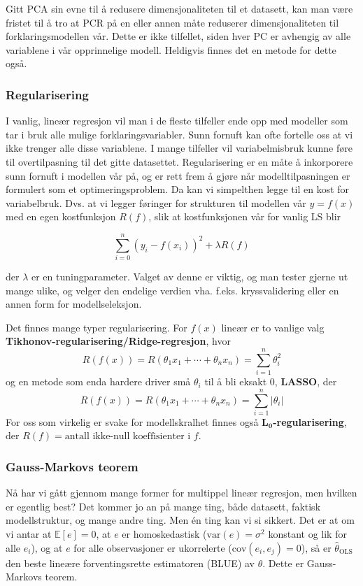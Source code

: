 Gitt PCA sin evne til å redusere dimensjonaliteten til et datasett, kan man være fristet til å tro at PCR på en eller annen måte reduserer dimensjonaliteten til forklaringsmodellen vår. Dette er ikke tilfellet, siden hver PC er avhengig av alle variablene i vår opprinnelige modell. Heldigvis finnes det en metode for dette også.

\subsubsection{Regularisering}
I vanlig, lineær regresjon vil man i de fleste tilfeller ende opp med modeller som tar i bruk alle mulige forklaringsvariabler. Sunn fornuft kan ofte fortelle oss at vi ikke trenger alle disse variablene. I mange tilfeller vil variabelmisbruk kunne føre til overtilpasning til det gitte datasettet. Regularisering er en måte å inkorporere sunn fornuft i modellen vår på, og er rett frem å gjøre når modelltilpasningen er formulert som et optimeringsproblem. Da kan vi simpelthen legge til en kost for variabelbruk. Dvs. at vi legger føringer for strukturen til modellen vår $y = f(x)$ med en egen kostfunksjon $R(f)$, slik at kostfunksjonen vår for vanlig LS blir

\begin{equation}
	\sum_{i=0}^{n}(y_i - f(x_i))^2 + \lambda R(f)
\end{equation}

der $\lambda$ er en tuningparameter. Valget av denne er viktig, og man tester gjerne ut mange ulike, og velger den endelige verdien vha. f.eks. kryssvalidering eller en annen form for modellseleksjon.

Det finnes mange typer regularisering. For $f(x)$ lineær er to vanlige valg \textbf{Tikhonov-regularisering/Ridge-regresjon}, hvor 
\begin{equation}
	R(f(x)) = R(\theta_1 x_1 + \cdots + \theta_n x_n) = \sum_{i = 1}^n \theta_i^2
\end{equation}
og en metode som enda hardere driver små $\theta_i$ til å bli eksakt 0, \textbf{LASSO}, der
\begin{equation}
	R(f(x)) = R(\theta_1 x_1 + \cdots + \theta_n x_n) = \sum_{i = 1}^n | \theta_i |
\end{equation}
For oss som virkelig er svake for modellskralhet finnes også \textbf{$\mathbf{L_0}$-regularisering}, der $R(f) = \textrm{antall ikke-null koeffisienter i } f$.

\subsubsection{Gauss-Markovs teorem}
Nå har vi gått gjennom mange former for multippel lineær regresjon, men hvilken er egentlig best? Det kommer jo an på mange ting, både datasett, faktisk modellstruktur, og mange andre ting. Men én ting kan vi si sikkert. Det er at om vi antar at $\mathbb{E}[e] = 0$, at $e$ er homoskedastisk ($\textrm{var}(e) = \sigma^2$ konstant og lik for alle $e_i$), og at $e$ for alle observasjoner er ukorrelerte ($\textrm{cov}(e_i, e_j) = 0$), så er $\hat{\theta}_\textrm{OLS}$ den beste lineære forventingsrette estimatoren (BLUE) av $\theta$. Dette er Gauss-Markovs teorem.
